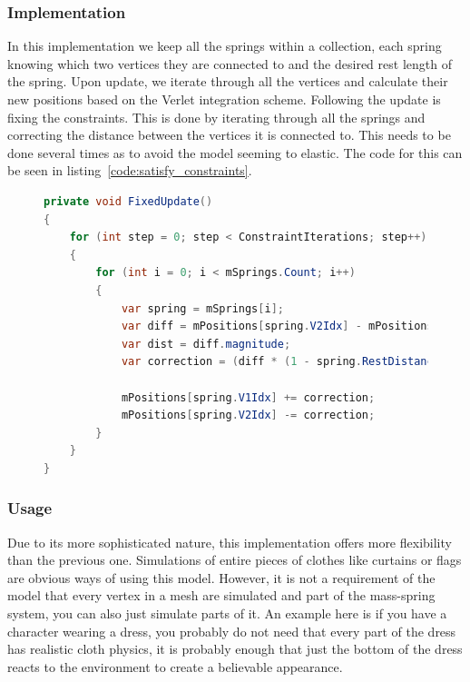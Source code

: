 \subsubsection{Implementation}
In this implementation we keep all the springs within a collection, each spring knowing which two vertices they are connected to and the desired rest length of the spring.
Upon update, we iterate through all the vertices and calculate their new positions based on the Verlet integration scheme.
Following the update is fixing the constraints. This is done by iterating through all the springs and correcting the distance between the vertices it is connected to.
This needs to be done several times as to avoid the model seeming to elastic.
The code for this can be seen in listing~\ref{code:satisfy_constraints}.

\begin{figure}
\begin{lstlisting}[label={code:satisfy_constraints},language=csharp,caption={Semi-Implicit Euler Integration}]
private void FixedUpdate()
{
    for (int step = 0; step < ConstraintIterations; step++)
    {
        for (int i = 0; i < mSprings.Count; i++)
        {
            var spring = mSprings[i];
            var diff = mPositions[spring.V2Idx] - mPositions[spring.V1Idx];
            var dist = diff.magnitude;
            var correction = (diff * (1 - spring.RestDistance / dist)) * 0.5f;

            mPositions[spring.V1Idx] += correction;
            mPositions[spring.V2Idx] -= correction;
        }
    }
}
\end{lstlisting}
\end{figure}

\subsubsection{Usage}
Due to its more sophisticated nature, this implementation offers more flexibility than the previous one.
Simulations of entire pieces of clothes like curtains or flags are obvious ways of using this model.
However, it is not a requirement of the model that every vertex in a mesh are simulated and part of the mass-spring system, you can also just simulate parts of it.
An example here is if you have a character wearing a dress, you probably do not need that every part of the dress
has realistic cloth physics, it is probably enough that just the bottom of the dress reacts to the environment
to create a believable appearance.

